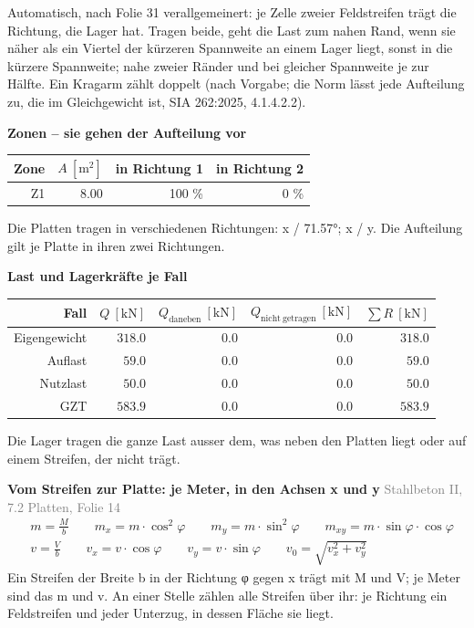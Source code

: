 \documentclass[11pt,a4paper]{article}
\newcommand{\normref}[1]{{\small\textcolor{gray}{#1}}}
\begin{document}
Automatisch, nach Folie 31 verallgemeinert: je Zelle zweier Feldstreifen trägt die Richtung, die Lager hat. Tragen beide, geht die Last zum nahen Rand, wenn sie näher als ein Viertel der kürzeren Spannweite an einem Lager liegt, sonst in die kürzere Spannweite; nahe zweier Ränder und bei gleicher Spannweite je zur Hälfte. Ein Kragarm zählt doppelt (nach Vorgabe; die Norm lässt jede Aufteilung zu, die im Gleichgewicht ist, SIA 262:2025, 4.1.4.2.2).

\noindent\textbf{Zonen – sie gehen der Aufteilung vor}
\begin{longtable}{rrrr}
\hline
Zone & $A\ [\mathrm{m}^{2}]$ & in Richtung 1 & in Richtung 2 \\
\hline
\endhead
Z1 & $8.00$ & 100 \% & 0 \% \\
\hline
\end{longtable}
Die Platten tragen in verschiedenen Richtungen: x / 71.57°; x / y. Die Aufteilung gilt je Platte in ihren zwei Richtungen.

\noindent\textbf{Last und Lagerkräfte je Fall}
\begin{longtable}{rrrrr}
\hline
Fall & $Q\ [\mathrm{kN}]$ & $Q_{\mathrm{daneben}}\ [\mathrm{kN}]$ & $Q_{\mathrm{nicht\ getragen}}\ [\mathrm{kN}]$ & $\sum R\ [\mathrm{kN}]$ \\
\hline
\endhead
Eigengewicht & $318.0$ & $0.0$ & $0.0$ & $318.0$ \\
Auflast & $59.0$ & $0.0$ & $0.0$ & $59.0$ \\
Nutzlast & $50.0$ & $0.0$ & $0.0$ & $50.0$ \\
GZT & $583.9$ & $0.0$ & $0.0$ & $583.9$ \\
\hline
\end{longtable}
Die Lager tragen die ganze Last ausser dem, was neben den Platten liegt oder auf einem Streifen, der nicht trägt.

\noindent\textbf{Vom Streifen zur Platte: je Meter, in den Achsen x und y} \hfill \normref{Stahlbeton II, 7.2 Platten, Folie 14}
\begin{equation*}
\begin{aligned} & m = \frac{M}{b} \qquad m_x = m \cdot \cos^2\varphi \qquad m_y = m \cdot \sin^2\varphi \qquad m_{xy} = m \cdot \sin\varphi \cdot \cos\varphi \\ & v = \frac{V}{b} \qquad v_x = v \cdot \cos\varphi \qquad v_y = v \cdot \sin\varphi \qquad v_0 = \sqrt{v_x^2 + v_y^2} \end{aligned}
\end{equation*}
Ein Streifen der Breite b in der Richtung φ gegen x trägt mit M und V; je Meter sind das m und v. An einer Stelle zählen alle Streifen über ihr: je Richtung ein Feldstreifen und jeder Unterzug, in dessen Fläche sie liegt.
\end{document}

